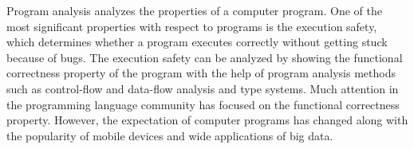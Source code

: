 Program analysis analyzes the properties of a computer program.
One of the most significant properties with respect to programs is the execution safety,
which determines whether a program executes correctly without getting stuck because of bugs.
 The execution safety can be analyzed
 by showing the functional correctness property of the
program 
with the help of
program analysis methods
such as control-flow and data-flow analysis and
type systems.
 Much attention in the programming language community has focused on the functional correctness property.
 However, the expectation of computer programs has changed along with the popularity of mobile devices and wide applications of big data. 

